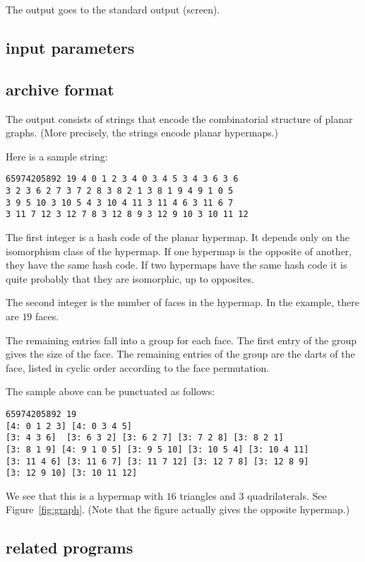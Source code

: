 The output goes to the standard output (screen).

\subsection{input parameters}


\subsection{archive format}

The output consists of strings that encode the combinatorial structure of planar graphs.  (More precisely, the strings encode planar hypermaps.)

Here is a sample string:
\begin{verbatim}
65974205892 19 4 0 1 2 3 4 0 3 4 5 3 4 3 6 3 6 
3 2 3 6 2 7 3 7 2 8 3 8 2 1 3 8 1 9 4 9 1 0 5 
3 9 5 10 3 10 5 4 3 10 4 11 3 11 4 6 3 11 6 7 
3 11 7 12 3 12 7 8 3 12 8 9 3 12 9 10 3 10 11 12
\end{verbatim}

The first integer is a hash code of the planar hypermap.  It depends only on the
isomorphism class of the hypermap.  If one hypermap is the opposite of another, they have the same hash code.  If two hypermaps have the same hash code
it is quite probably that they are isomorphic, up to opposites.

The second integer is the number of faces in the hypermap.  In the example,
there are $19$ faces.

The remaining entries fall into a group for each face.  The first entry of the group
gives the size of the face.  The remaining entries of the group are the darts of
the face, listed in cyclic order according to the face permutation.

The sample above can be punctuated as follows:
\begin{verbatim}
65974205892 19 
[4: 0 1 2 3] [4: 0 3 4 5] 
[3: 4 3 6]  [3: 6 3 2] [3: 6 2 7] [3: 7 2 8] [3: 8 2 1] 
[3: 8 1 9] [4: 9 1 0 5] [3: 9 5 10] [3: 10 5 4] [3: 10 4 11] 
[3: 11 4 6] [3: 11 6 7] [3: 11 7 12] [3: 12 7 8] [3: 12 8 9] 
[3: 12 9 10] [3: 10 11 12]
\end{verbatim}
We see that this is a hypermap
with $16$ triangles and $3$ quadrilaterals.  See Figure~\ref{fig:graph}.
(Note that the figure actually gives the opposite hypermap.)




\subsection{related programs}


